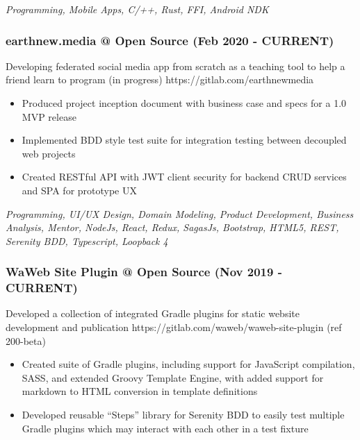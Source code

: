 \emph{Programming, Mobile Apps, C/++, Rust, FFI, Android NDK}

\hypertarget{earthnew.media-open-source-feb-2020---current}{%
\subsubsection{earthnew.media @ Open Source (Feb 2020 -
CURRENT)}\label{earthnew.media-open-source-feb-2020---current}}

Developing federated social media app from scratch as a teaching tool to
help a friend learn to program (in progress)
https://gitlab.com/earthnewmedia

\begin{itemize}
\tightlist
\item
  Produced project inception document with business case and specs for a
  1.0 MVP release
\item
  Implemented BDD style test suite for integration testing between
  decoupled web projects
\item
  Created RESTful API with JWT client security for backend CRUD services
  and SPA for prototype UX
\end{itemize}

\emph{Programming, UI/UX Design, Domain Modeling, Product Development,
Business Analysis, Mentor, NodeJs, React, Redux, SagasJs, Bootstrap,
HTML5, REST, Serenity BDD, Typescript, Loopback 4}

\hypertarget{waweb-site-plugin-open-source-nov-2019---current}{%
\subsubsection{WaWeb Site Plugin @ Open Source (Nov 2019 -
CURRENT)}\label{waweb-site-plugin-open-source-nov-2019---current}}

Developed a collection of integrated Gradle plugins for static website
development and publication https://gitlab.com/waweb/waweb-site-plugin
(ref 200-beta)

\begin{itemize}
\tightlist
\item
  Created suite of Gradle plugins, including support for JavaScript
  compilation, SASS, and extended Groovy Template Engine, with added
  support for markdown to HTML conversion in template definitions
\item
  Developed reusable ``Steps'' library for Serenity BDD to easily test
  multiple Gradle plugins which may interact with each other in a test
  fixture
\end{itemize}


